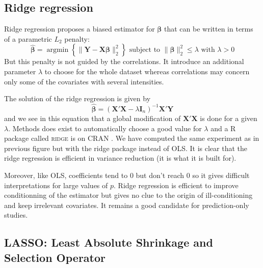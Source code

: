 \documentclass[12pt,a4paper]{report}
\begin{document}
		\subsection{Ridge regression}		%

Ridge regression \cite{hoerl1970ridge,marquardt1975ridge} proposes a biased estimator for $\boldsymbol{\beta}$ that can be written in terms of a parametric $L_2$ penalty:
	\begin{equation}
		 \boldsymbol{\hat{\beta}}=\operatorname{argmin} \left\lbrace \parallel \boldsymbol{Y}-\boldsymbol{X\beta}\parallel_2^2 \right\rbrace \textrm{ subject to } \parallel \boldsymbol{\beta} \parallel_2^2\leq \lambda \textrm{ with } \lambda>0
	\end{equation}
	But this penalty is not guided by the correlations. It introduce an additional parameter $\lambda$ to choose for the whole dataset  whereas correlations may concern only some of the covariates with several intensities.
	
	The solution of the ridge regression is given by
	\begin{equation}
		 \hat{\boldsymbol{\beta}}=\left(\boldsymbol{X}'\boldsymbol{X} -\lambda\boldsymbol{I}_n\right) ^{-1}\boldsymbol{X}'\boldsymbol{Y}\label{betaridge}
	\end{equation}
	and we see in this equation that a global modification of $\boldsymbol{X}'\boldsymbol{X}$ is done for a given $\lambda$. Methods does exist to automatically choose a good value for $\lambda$ \cite{cule2013ridge,er2013systematic} and a R package called \textsc{ridge} is on CRAN \cite{packageridge}. 
	We have computed the same experiment as in previous figure but with the ridge package instead of OLS. It is clear that the ridge regression is efficient in variance reduction (it is what it is built for).
	
	
	
	Moreover, like OLS, coefficients tend to 0 but don't reach 0 so it gives difficult interpretations for large values of $p$. Ridge regression is efficient to improve conditionning of the estimator but gives no clue to the origin of ill-conditioning and keep irrelevant covariates. It remains a good candidate for prediction-only studies. 
	
			
		\subsection{LASSO: Least Absolute Shrinkage and Selection Operator }		%
\end{document}
